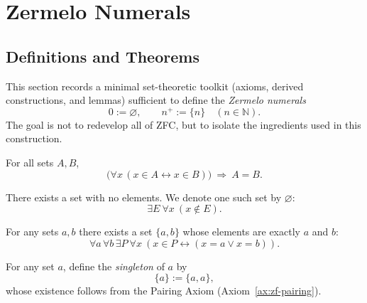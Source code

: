 
\section{Zermelo Numerals}
\label{sec:zermelo-numerals}

\subsection{Definitions and Theorems}

\begin{remark}[Purpose]
This section records a minimal set-theoretic toolkit (axioms, derived constructions,
and lemmas) sufficient to define the \emph{Zermelo numerals}
\[
0 := \varnothing,\qquad n^{+} := \{n\}\quad (n \in \mathbb{N}).
\]
The goal is not to redevelop all of ZFC, but to isolate the ingredients used in this construction.
\end{remark}


\begin{axiom}[Extensionality]
\label{ax:zf-extensionality}
For all sets $A,B$,
\[
\bigl(\forall x\,(x\in A \leftrightarrow x\in B)\bigr)\ \Rightarrow\ A=B.
\]
\end{axiom}

\begin{axiom}
\label{ax:zf-empty-set}
There exists a set with no elements. We denote one such set by $\varnothing$:
\[
\exists E\ \forall x\ (x\notin E).
\]
\end{axiom}

\begin{axiom}[Pairing]
\label{ax:zf-pairing}
For any sets $a,b$ there exists a set $\{a,b\}$ whose elements are exactly $a$ and $b$:
\[
\forall a\,\forall b\,\exists P\ \forall x\ (x\in P \leftrightarrow (x=a \lor x=b)).
\]
\end{axiom}

\begin{definition}[Singleton]
\label{def:singleton}
For any set $a$, define the \emph{singleton} of $a$ by
\[
\{a\} := \{a,a\},
\]
whose existence follows from the Pairing Axiom (Axiom~\ref{ax:zf-pairing}).
\end{definition}

